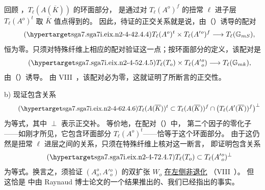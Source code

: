 回顾 ，$T_\ell(A(\overline K))$ 的环面部分，
是通过对 $T_\ell(A^o)^f$ 的扭常 $\ell$ 进子层 $T_\ell(A^o)^t$ 取 $\overline K$ 值点得到的。
因此，待证的正交关系就是说，由（）诱导的配对
\begin{equation}\tag{\SGARefTarget{sga7.sga7i.eix.n2-4-4}{2.4.4}}
 T_\ell(A^o)^t\times T_\ell(A'{}^o)^f
 \longrightarrow T_\ell(\mathbb G_{mS}),
\end{equation}
恒为零。只须对特殊纤维上相应的配对验证这一点；按环面部分的定义，该配对是
\begin{equation}\tag{\SGARefTarget{sga7.sga7i.eix.n2-4-5}{2.4.5}}
 T_\ell(T_o)\times T_\ell(A'{}_o^o)
 \longrightarrow T_\ell(\mathbb G_{mk}),
\end{equation}
由（）诱导。
由 VIII~，该配对必为零，这就证明了所断言的正交性。

\smallskip
\noindent
b) 现证包含关系
\begin{equation}\tag{\SGARefTarget{sga7.sga7i.eix.n2-4-6}{2.4.6}}
 T_\ell(A(\overline K))^t\subset
 T_\ell(A(\overline K))^f\cap
 \bigl(T_\ell(A'(\overline K))^f\bigr)^\perp
\end{equation}
为等式，其中 $\perp$ 表示正交补。
等价地，在配对（）中，
第二个因子的零化子——如刚才所见，它包含环面部分 $T_\ell(A^o)^t$——恰等于这个环面部分。
由于这仍然是扭常 $\ell$ 进层之间的关系，只须在特殊纤维上核对这一断言，
即证明包含关系
\begin{equation}\tag{\SGARefTarget{sga7.sga7i.eix.n2-4-7}{2.4.7}}
 T_\ell(T_o)\subset T_\ell(A'{}_o^o)^\perp
\end{equation}
为等式。换言之，须验证 $(A_o^o,A'{}_o^o)$ 的双扩张 $W_o$ \underline{在左侧非退化}
（VIII~）。
但这恰是  中由 Raynaud 博士论文的一个结果推出的、我们已经指出的事实。



